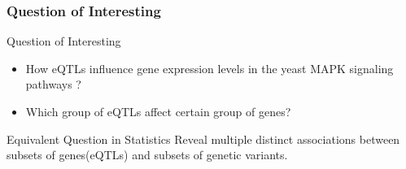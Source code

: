 \begin{frame}\frametitle{Question of Interesting}
    \begin{block}{Question of Interesting}
        \begin{itemize}
        \item How eQTLs influence gene expression levels in the yeast MAPK signaling pathways ?
        \item Which group of eQTLs affect certain group of genes?
        \end{itemize}
    \end{block}
    
    \begin{block}{Equivalent Question in Statistics}
        Reveal multiple distinct associations between subsets of genes(eQTLs) and subsets of genetic variants. 
    \end{block}
\end{frame}
